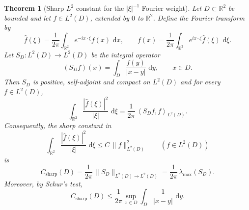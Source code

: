 \documentclass{amsart}
\newcommand{\R}{\mathbb{R}}
\newcommand{\dd}{\,\mathrm{d}}
\newcommand{\ip}[2]{\left\langle #1,#2\right\rangle}
\theoremstyle{plain}
\newtheorem{theorem}{Theorem}
\theoremstyle{remark}
\begin{document}
\begin{theorem}[Sharp $L^2$ constant for the $|\xi|^{-1}$ Fourier weight]\label{thm:sharp-constant}
Let $D\subset\R^2$ be bounded and let $f\in L^2(D)$, extended by $0$ to $\R^2$.
Define the Fourier transform by
\[
\widehat f(\xi)=\frac1{2\pi}\int_{\R^2}e^{-ix\cdot\xi}f(x)\,\dd x,
\qquad
f(x)=\frac1{2\pi}\int_{\R^2}e^{ix\cdot\xi}\widehat f(\xi)\,\dd\xi .
\]
Let $S_D:L^2(D)\to L^2(D)$ be the integral operator
\[
(S_D f)(x)=\int_D\frac{f(y)}{|x-y|}\,\dd y,\qquad x\in D.
\]
Then $S_D$ is positive, self-adjoint and compact on $L^2(D)$ and for every
$f\in L^2(D)$,
\begin{equation}\label{eq:quadratic-form}
\int_{\R^2}\frac{|\widehat f(\xi)|^2}{|\xi|}\,\dd\xi
=\frac{1}{2\pi}\,\ip{S_D f}{f}_{L^2(D)}.
\end{equation}
Consequently, the sharp constant in
\[
\int_{\R^2}\frac{|\widehat f(\xi)|^2}{|\xi|}\,\dd\xi
\le C\,\|f\|_{L^2(D)}^2
\qquad (f\in L^2(D))
\]
is
\[
C_{\mathrm{sharp}}(D)=\frac{1}{2\pi}\,\|S_D\|_{L^2(D)\to L^2(D)}
=\frac{1}{2\pi}\,\lambda_{\max}(S_D).
\]
Moreover, by Schur's test,
\[
C_{\mathrm{sharp}}(D)\le
\frac{1}{2\pi}\sup_{x\in D}\int_D \frac{1}{|x-y|}\,\dd y.
\]
\end{theorem}
\end{document}
